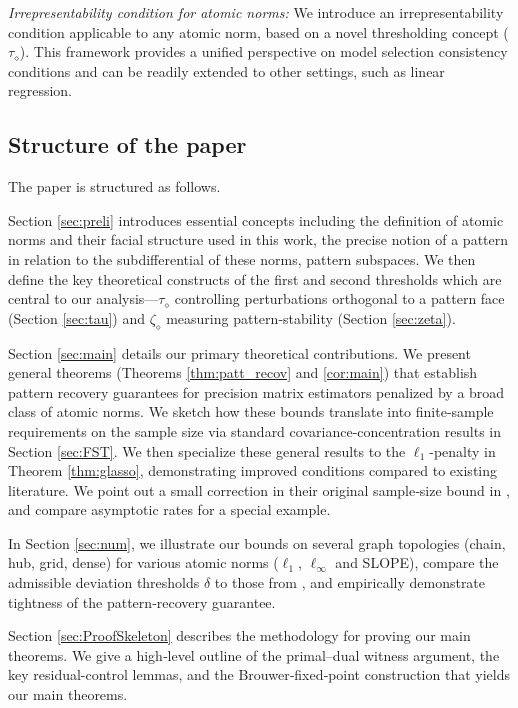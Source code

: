 \documentclass[12pt]{amsart}
\numberwithin{equation}{section}
\numberwithin{equation}{section}
\theoremstyle{definition}
\begin{document}
\emph{Irrepresentability condition for atomic norms:} We introduce an  irrepresentability condition applicable to any atomic norm, based on a novel thresholding concept ($\tau_\diamond$). This framework provides a unified perspective on model selection consistency conditions and can be readily extended to other settings, such as linear regression.


\subsection{Structure of the paper}

The paper is structured as follows. 

Section \ref{sec:preli} introduces essential concepts including the definition of atomic norms  and their facial structure used in this work, the precise notion of a pattern in relation to the subdifferential of these norms, pattern subspaces.  We then define the key theoretical constructs of the first and second thresholds which are central to our analysis---$\tau_\diamond$ controlling perturbations orthogonal to a pattern face (Section \ref{sec:tau})  and $\zeta_\diamond$  measuring pattern‐stability (Section \ref{sec:zeta}).


Section \ref{sec:main} details our primary theoretical contributions. We present general theorems (Theorems \ref{thm:patt_recov} and \ref{cor:main}) that establish pattern recovery guarantees for precision matrix estimators penalized by a broad class of atomic norms. We sketch how these bounds translate into finite‐sample requirements on the sample size via standard covariance‐concentration results in Section \ref{sec:FST}.
We then specialize these general results to the $\ell_1$-penalty in Theorem \ref{thm:glasso}, demonstrating improved conditions compared to existing literature. We point out a small correction in their original sample‐size bound in \cite{ravikumar2011graphical}, and compare asymptotic rates for a special example. 

In Section \ref{sec:num}, we illustrate our bounds on several graph topologies (chain, hub, grid, dense) for various atomic norms ($\ell_1$, $\ell_\infty$ and SLOPE), compare the admissible deviation thresholds $\delta$ to those from \cite{ravikumar2011graphical}, and empirically demonstrate tightness of the pattern‐recovery guarantee.

Section \ref{sec:ProofSkeleton} describes the methodology for proving our main theorems. We give a high‐level outline of the primal–dual witness argument, the key residual-control lemmas, and the Brouwer‐fixed‐point construction that yields our main theorems.
\end{document}
